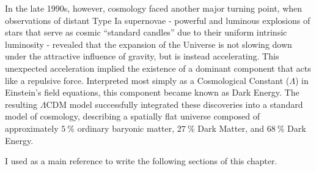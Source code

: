\documentclass[12pt,a4paper,oneside]{report}
\begin{document}
In the late 1990s, however, cosmology faced another major turning point, when observations of distant Type Ia supernovae - powerful and luminous explosions of stars that serve as cosmic “standard candles” due to their uniform intrinsic luminosity - revealed that the expansion of the Universe is not slowing down under the attractive influence of gravity, but is instead accelerating. This unexpected acceleration implied the existence of a dominant component that acts like a repulsive force. Interpreted most simply as a Cosmological Constant ($\Lambda$) in Einstein's field equations, this component became known as Dark Energy. The resulting $\Lambda \mathrm{CDM}$ model successfully integrated these discoveries into a standard model of cosmology, describing a spatially flat universe composed of approximately $\SI{5}{\%}$ ordinary baryonic matter, $\SI{27}{\%}$ Dark Matter, and $\SI{68}{\%}$ Dark Energy.

I used \cite{Longair} as a main reference to write the following sections of this chapter.
\end{document}
